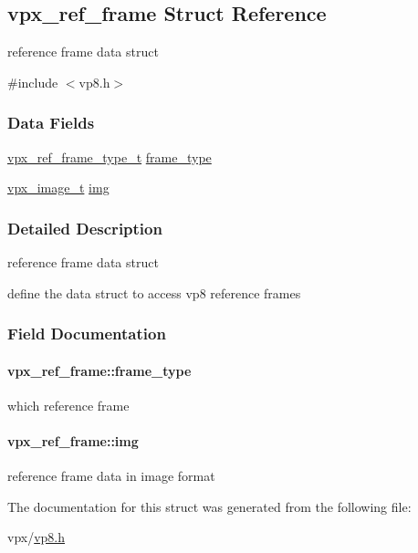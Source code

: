 \hypertarget{structvpx__ref__frame}{\subsection{vpx\-\_\-ref\-\_\-frame Struct Reference}
\label{structvpx__ref__frame}
}


reference frame data struct  




{\ttfamily \#include $<$vp8.\-h$>$}

\subsubsection*{Data Fields}
\begin{DoxyCompactItemize}
\item 
\hyperlink{group__vp8_ga75ac0689a81bf7202382a225c5b451b4}{vpx\-\_\-ref\-\_\-frame\-\_\-type\-\_\-t} \hyperlink{structvpx__ref__frame_a7fbe51de592d0ff16d9fbd4d2b367c9b}{frame\-\_\-type}
\item 
\hyperlink{vpx__image_8h_abf5ac962cc6d71b4f0e39b1b0d033e55}{vpx\-\_\-image\-\_\-t} \hyperlink{structvpx__ref__frame_a972d24d0243f51f84eef7e1b79c6c414}{img}
\end{DoxyCompactItemize}


\subsubsection{Detailed Description}
reference frame data struct 

define the data struct to access vp8 reference frames 

\subsubsection{Field Documentation}
\hypertarget{structvpx__ref__frame_a7fbe51de592d0ff16d9fbd4d2b367c9b}{
\paragraph[{frame\-\_\-type}]{ vpx\-\_\-ref\-\_\-frame\-::frame\-\_\-type}}\label{structvpx__ref__frame_a7fbe51de592d0ff16d9fbd4d2b367c9b}
which reference frame \hypertarget{structvpx__ref__frame_a972d24d0243f51f84eef7e1b79c6c414}{
\paragraph[{img}]{ vpx\-\_\-ref\-\_\-frame\-::img}}\label{structvpx__ref__frame_a972d24d0243f51f84eef7e1b79c6c414}
reference frame data in image format 

The documentation for this struct was generated from the following file\-:\begin{DoxyCompactItemize}
\item 
vpx/\hyperlink{vp8_8h}{vp8.\-h}\end{DoxyCompactItemize}
